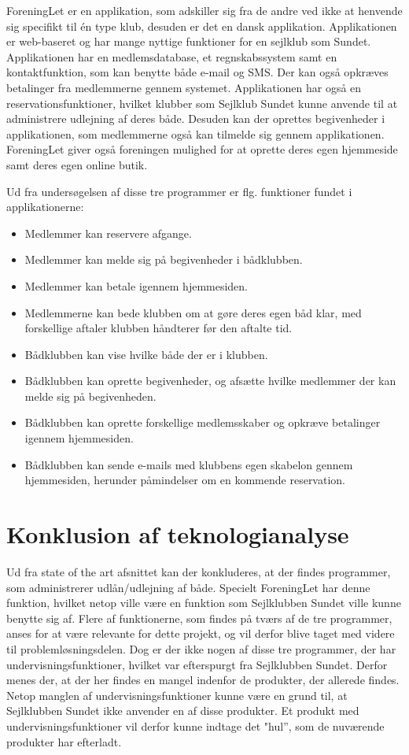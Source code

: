 ForeningLet er en applikation, som adskiller sig fra de andre ved ikke at henvende sig specifikt til én type klub, desuden er det en dansk applikation. 
Applikationen er web-baseret og har mange nyttige funktioner for en sejlklub som Sundet. 
Applikationen har en medlemsdatabase, et regnskabssystem samt en kontaktfunktion, som kan benytte både e-mail og SMS. 
Der kan også opkræves betalinger fra medlemmerne gennem systemet. 
Applikationen har også en reservationsfunktioner, hvilket klubber som Sejlklub Sundet kunne anvende til at administrere udlejning af deres både. 
Desuden kan der oprettes begivenheder i applikationen, som medlemmerne også kan tilmelde sig gennem applikationen. ForeningLet giver også foreningen mulighed for at oprette deres egen hjemmeside samt deres egen online butik. 

Ud fra undersøgelsen af disse tre programmer er flg. funktioner fundet i applikationerne:

\begin{itemize}
  \item Medlemmer kan reservere afgange.
  \item Medlemmer kan melde sig på begivenheder i bådklubben.
  \item Medlemmer kan betale igennem hjemmesiden.
  \item Medlemmerne kan bede klubben om at gøre deres egen båd klar, med forskellige aftaler klubben håndterer
        før den aftalte tid.
  \item Bådklubben kan vise hvilke både der er i klubben.
  \item Bådklubben kan oprette begivenheder, og afsætte hvilke medlemmer der kan melde sig på begivenheden.
  \item Bådklubben kan oprette forskellige medlemsskaber og opkræve betalinger igennem hjemmesiden.
  \item Bådklubben kan sende e-mails med klubbens egen skabelon gennem hjemmesiden, herunder påmindelser om en
        kommende reservation.
\end{itemize}
\section{Konklusion af teknologianalyse}

Ud fra state of the art afsnittet kan der konkluderes, at der findes programmer, som administrerer udlån/udlejning af både.
Specielt ForeningLet har denne funktion, hvilket netop ville være en funktion som Sejlklubben Sundet ville kunne benytte sig af.
Flere af funktionerne, som findes på tværs af de tre programmer, anses for at være relevante for dette projekt, og vil derfor blive taget med videre til problemløsningsdelen.
Dog er der ikke nogen af disse tre programmer, der har undervisningsfunktioner, hvilket var efterspurgt fra Sejlklubben Sundet. Derfor menes der, at der her findes en mangel indenfor de produkter, der allerede findes.
Netop manglen af undervisningsfunktioner kunne være en grund til, at Sejlklubben Sundet ikke anvender en af disse produkter.
Et produkt med undervisningsfunktioner vil derfor kunne indtage det "hul'', som de nuværende produkter har efterladt. 

